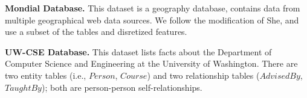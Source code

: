 \documentclass{vldb}
\begin{document}
\noindent\textbf{Mondial Database.} %
This dataset is a geography database, contains data from multiple geographical web data sources. 
We follow the modification of She\cite{wangMondial}, and use a subset of the tables and disretized features. %


\noindent\textbf{UW-CSE Database.}
This dataset lists facts about the Department of Computer Science and Engineering at the University of Washington\cite{Domingos2007}. There are two entity tables (i.e., $Person$, $Course$) and two relationship tables ($AdvisedBy$, $TaughtBy$); both are person-person self-relationships. 
\end{document}
